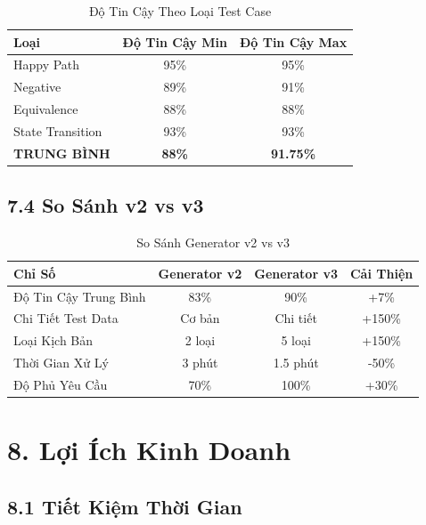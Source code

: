 \documentclass[14pt,a4paper]{article}
\begin{document}
\begin{table}[h]
\centering
\begin{tabular}{|l|c|c|}
\hline
\textbf{Loại} & \textbf{Độ Tin Cậy Min} & \textbf{Độ Tin Cậy Max} \\
\hline
Happy Path & 95\% & 95\% \\
\hline
Negative & 89\% & 91\% \\
\hline
Equivalence & 88\% & 88\% \\
\hline
State Transition & 93\% & 93\% \\
\hline
\textbf{TRUNG BÌNH} & \textbf{88\%} & \textbf{91.75\%} \\
\hline
\end{tabular}
\caption{Độ Tin Cậy Theo Loại Test Case}
\end{table}

\subsection{7.4 So Sánh v2 vs v3}

\begin{table}[h]
\centering
\begin{tabular}{|l|c|c|c|}
\hline
\textbf{Chỉ Số} & \textbf{Generator v2} & \textbf{Generator v3} & \textbf{Cải Thiện} \\
\hline
Độ Tin Cậy Trung Bình & 83\% & 90\% & +7\% \\
\hline
Chi Tiết Test Data & Cơ bản & Chi tiết & +150\% \\
\hline
Loại Kịch Bản & 2 loại & 5 loại & +150\% \\
\hline
Thời Gian Xử Lý & 3 phút & 1.5 phút & -50\% \\
\hline
Độ Phủ Yêu Cầu & 70\% & 100\% & +30\% \\
\hline
\end{tabular}
\caption{So Sánh Generator v2 vs v3}
\end{table}

\section{8. Lợi Ích Kinh Doanh}

\subsection{8.1 Tiết Kiệm Thời Gian}
\end{document}
